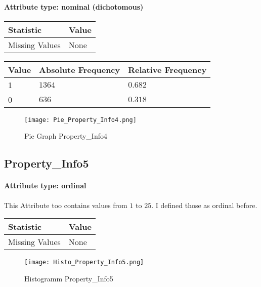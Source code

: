 \paragraph{Attribute type: nominal (dichotomous)}

\begin{table}[H]
	\renewcommand{\arraystretch}{1.25}
	\begin{tabular}{l|l}
		\textbf{Statistic} & \textbf{Value}\\\hline
		Missing Values& None\\\hline
	\end{tabular}
\end{table}
\begin{table}[H]
	\renewcommand{\arraystretch}{1.25}
	\begin{tabular}{l|l|l}
		\textbf{Value} & \textbf{Absolute Frequency} & \textbf{Relative Frequency}\\\hline
		1&$1364$&$0.682$\\\hline
		0&$636$&$0.318$
	\end{tabular}
\end{table}
\begin{figure}[H]
	\begin{center}
		\texttt{[image: Pie\_Property\_Info4.png]}
	\end{center}
	\caption{Pie Graph Property\_Info4}
\end{figure}

\subsection{Property\_Info5}
\paragraph{Attribute type: ordinal} This Attribute too contains values from $1$ to $25$. I defined those as ordinal before.

\begin{table}[H]
	\renewcommand{\arraystretch}{1.25}
	\begin{tabular}{l|l}
		\textbf{Statistic} & \textbf{Value}\\\hline
		Missing Values& None\\\hline
	\end{tabular}
\end{table}

\begin{figure}[H]
	\begin{center}
		\texttt{[image: Histo\_Property\_Info5.png]}
	\end{center}
	\caption{Histogramm Property\_Info5}
\end{figure}

